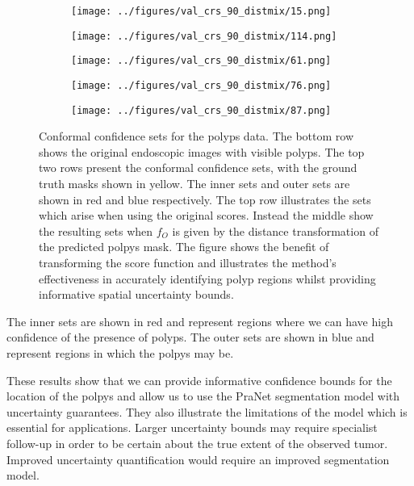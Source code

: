 \begin{figure}
\begin{subfigure}{0.19\textwidth}
		\centering
		\texttt{[image: ../figures/val\_crs\_90\_distmix/15.png]}
		\label{fig:1}
	\end{subfigure}
	\begin{subfigure}{0.19\textwidth}
		\centering
		\texttt{[image: ../figures/val\_crs\_90\_distmix/114.png]}
		\label{fig:1}
	\end{subfigure}
	\begin{subfigure}{0.19\textwidth}
		\centering
		\texttt{[image: ../figures/val\_crs\_90\_distmix/61.png]}
		\label{fig:1}
	\end{subfigure}
	\begin{subfigure}{0.19\textwidth}
		\centering
		\texttt{[image: ../figures/val\_crs\_90\_distmix/76.png]}
		\label{fig:1}
	\end{subfigure}
	\begin{subfigure}{0.19\textwidth}
		\centering
		\texttt{[image: ../figures/val\_crs\_90\_distmix/87.png]}
		\label{fig:1}
	\end{subfigure}
	\label{fig:grid}
	\caption{Conformal confidence sets for the polyps data. The bottom row shows the original endoscopic images with visible polyps. The top two rows present the conformal confidence sets, with the ground truth masks shown in yellow. The inner sets and outer sets are shown in red and blue respectively. The top row illustrates the sets which arise when using the original scores. Instead the middle show the resulting sets when $f_O$ is given by the distance transformation of the predicted polpys mask. The figure shows the benefit of transforming the score function and illustrates the method's effectiveness in accurately identifying polyp regions whilst providing informative spatial uncertainty bounds.}\label{fig:polpys}
\end{figure}


The inner sets are shown in red and represent regions where we can have high confidence of the presence of polyps. The outer sets are shown in blue and represent regions in which the polpys may be.

These results show that we can provide informative confidence bounds for the location of the polpys and allow us to use the PraNet segmentation model with uncertainty guarantees. They also illustrate the limitations of the model which is essential for applications. Larger uncertainty bounds may require specialist follow-up in order to be certain about the true extent of the observed tumor. Improved uncertainty quantification would require an improved segmentation model. 

